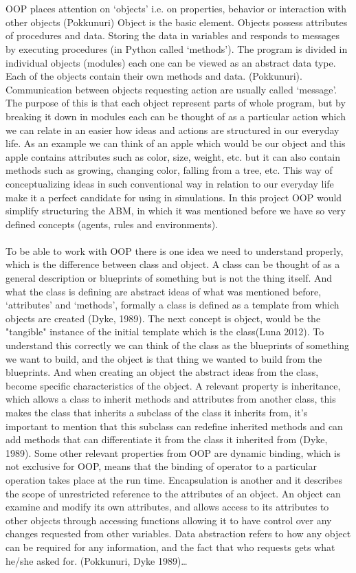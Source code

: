 \documentclass{article}
\begin{document}
\\\\OOP places attention on ‘objects’ i.e. on properties, behavior or interaction with other objects (Pokkunuri) Object is the basic element. Objects possess attributes of procedures and data. Storing the data in variables and responds to messages by executing procedures (in Python called ‘methods’). The program is divided in individual objects (modules) each one can be viewed as an abstract data type. Each of the objects contain their own methods and data. (Pokkunuri). Communication between objects requesting action are usually called ‘message’. The purpose of this is that each object represent parts of whole program, but by breaking it down in modules each can be thought of as a particular action which we can relate in an easier how ideas and actions are structured in our everyday life. As an example we can think of an apple which would be our object and this apple contains attributes such as color, size, weight, etc. but it can also contain methods such as growing, changing color, falling from a tree, etc. This way of conceptualizing ideas in such conventional way in relation to our everyday life make it a perfect candidate for using in simulations. In this project OOP would simplify structuring the ABM, in which it was mentioned before we have so very defined concepts (agents, rules and environments).
\\\\To be able to work with OOP there is one idea we need to understand properly, which is the difference between class and object. A class can be thought of as a general description or blueprints of something but is not the thing itself.  And what the class is defining are abstract ideas of what was mentioned before, ‘attributes’ and ‘methods’, formally a class is defined as a template from which objects are created (Dyke, 1989). The next concept is object,  would be the "tangible" instance of the initial template which is the class(Luna 2012). To understand this correctly we can think of the class as the blueprints of something we want to build, and the object is that thing we wanted to build from the blueprints. And when creating an object the abstract ideas from the class, become specific characteristics of the object. A relevant property is inheritance, which allows a class to inherit methods and attributes from another class, this makes the class that inherits a subclass of the class it inherits from, it’s important to mention that this subclass can redefine inherited methods and can add methods that can differentiate it from the class it inherited from (Dyke, 1989).  Some other relevant properties from OOP are dynamic binding, which is not exclusive for OOP, means that the binding of operator to a particular operation takes place at the run time. Encapsulation is another and it describes the scope of unrestricted reference to the attributes of an object. An object can examine and modify its own attributes, and allows access to its attributes to other objects through accessing functions allowing it to have control over any changes requested from other variables. Data abstraction refers to how any object can be required for any information, and the fact that who requests gets what he/she asked for. (Pokkunuri, Dyke 1989)…
\end{document}
